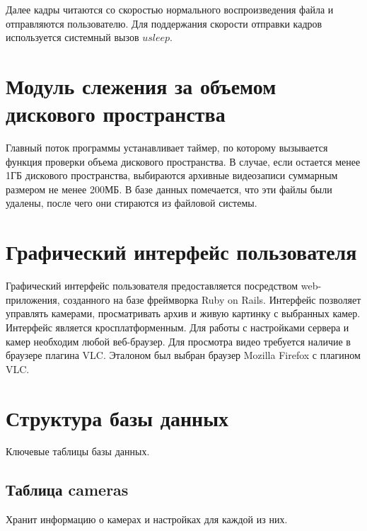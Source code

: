Далее кадры читаются со скоростью нормального воспроизведения файла и отправляются пользователю.
Для поддержания скорости отправки кадров используется системный вызов $usleep$.


\section{Модуль слежения за объемом дискового пространства}
Главный поток программы устанавливает таймер, по которому вызывается функция проверки объема дискового
пространства. В случае, если остается менее 1ГБ дискового пространства, выбираются архивные видеозаписи
суммарным размером не менее 200МБ. В базе данных помечается, что эти файлы были удалены, после чего они
стираются из файловой системы.

\section{Графический интерфейс пользователя}
Графический интерфейс пользователя предоставляется посредством web-приложения, созданного на базе
фреймворка Ruby on Rails. Интерфейс позволяет управлять камерами, просматривать архив и
живую картинку с выбранных камер. Интерфейс является кросплатформенным. Для работы с настройками
сервера и камер необходим любой веб-браузер. Для просмотра видео требуется наличие в
браузере плагина VLC.
Эталоном был выбран браузер Mozilla Firefox с плагином VLC.

\section{Структура базы данных }
Ключевые таблицы базы данных.

\subsection{Таблица cameras}
Хранит информацию о камерах и настройках для каждой из них.

